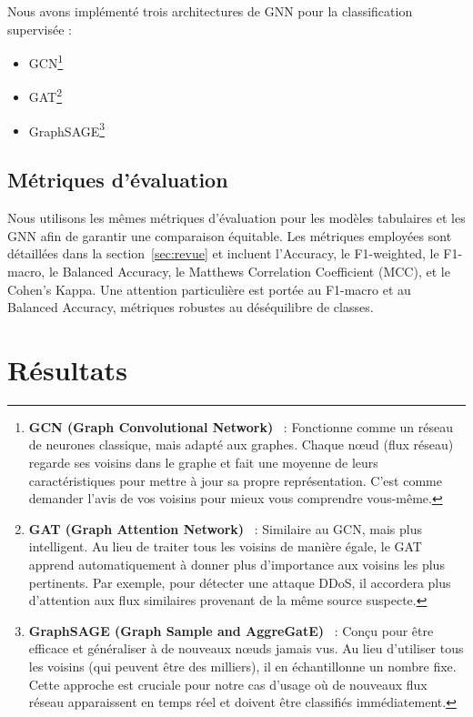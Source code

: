 ﻿\documentclass[11pt,a4paper]{article}
\begin{document}
Nous avons implémenté trois architectures de GNN pour la classification supervisée :
\begin{itemize}
    \item GCN\footnote{\textbf{GCN (Graph Convolutional Network)}~\cite{kipf2017semi, hamilton2020graph} : Fonctionne comme un réseau de neurones classique, mais adapté aux graphes. Chaque nœud (flux réseau) regarde ses voisins dans le graphe et fait une moyenne de leurs caractéristiques pour mettre à jour sa propre représentation. C'est comme demander l'avis de vos voisins pour mieux vous comprendre vous-même.}
    \item GAT\footnote{\textbf{GAT (Graph Attention Network)}~\cite{velickovic2018graph, hamilton2020graph} : Similaire au GCN, mais plus intelligent. Au lieu de traiter tous les voisins de manière égale, le GAT apprend automatiquement à donner plus d'importance aux voisins les plus pertinents. Par exemple, pour détecter une attaque DDoS, il accordera plus d'attention aux flux similaires provenant de la même source suspecte.}
    \item GraphSAGE\footnote{\textbf{GraphSAGE (Graph Sample and AggreGatE)}~\cite{hamilton2017inductive, hamilton2020graph} : Conçu pour être efficace et généraliser à de nouveaux nœuds jamais vus. Au lieu d'utiliser tous les voisins (qui peuvent être des milliers), il en échantillonne un nombre fixe. Cette approche est cruciale pour notre cas d'usage où de nouveaux flux réseau apparaissent en temps réel et doivent être classifiés immédiatement.}
\end{itemize}


\subsection{Métriques d'évaluation}

Nous utilisons les mêmes métriques d'évaluation pour les modèles tabulaires et les GNN afin de garantir une comparaison équitable. Les métriques employées sont détaillées dans la section~\ref{sec:revue} et incluent l'Accuracy, le F1-weighted, le F1-macro, le Balanced Accuracy, le Matthews Correlation Coefficient (MCC), et le Cohen's Kappa. Une attention particulière est portée au F1-macro et au Balanced Accuracy, métriques robustes au déséquilibre de classes.

\section{Résultats}
\label{sec:resultats}
\end{document}
